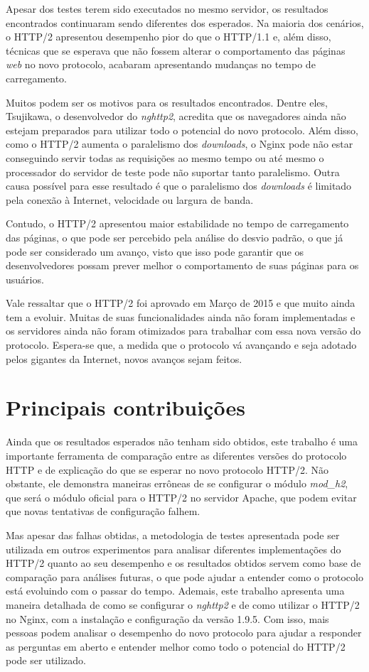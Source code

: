 Apesar dos testes terem sido executados no mesmo servidor, os resultados encontrados continuaram sendo diferentes dos esperados. Na maioria dos cenários, o HTTP/2 apresentou desempenho pior do que o HTTP/1.1 e, além disso, técnicas que se esperava que não fossem alterar o comportamento das páginas \textit{web} no novo protocolo, acabaram apresentando mudanças no tempo de carregamento.

Muitos podem ser os motivos para os resultados encontrados. Dentre eles, Tsujikawa, o desenvolvedor do \textit{nghttp2}, acredita que os navegadores ainda não estejam preparados para utilizar todo o potencial do novo protocolo. Além disso, como o HTTP/2 aumenta o paralelismo dos \textit{downloads}, o Nginx pode não estar conseguindo servir todas as requisições ao mesmo tempo ou até mesmo o processador do servidor de teste pode não suportar tanto paralelismo. Outra causa possível para esse resultado é que o paralelismo dos \textit{downloads} é limitado pela conexão à Internet, velocidade ou largura de banda.

Contudo, o HTTP/2 apresentou maior estabilidade no tempo de carregamento das páginas, o que pode ser percebido pela análise do desvio padrão, o que já pode ser considerado um avanço, visto que isso pode garantir que os desenvolvedores possam prever melhor o comportamento de suas páginas para os usuários.

Vale ressaltar que o HTTP/2 foi aprovado em Março de 2015 e que muito ainda tem a evoluir. Muitas de suas funcionalidades ainda não foram implementadas e os servidores ainda não foram otimizados para trabalhar com essa nova versão do protocolo. Espera-se que, a medida que o protocolo vá avançando e seja adotado pelos gigantes da Internet, novos avanços sejam feitos.

\section{Principais contribuições}
\label{principaiscontribuicoes}

Ainda que os resultados esperados não tenham sido obtidos, este trabalho é uma importante ferramenta de comparação entre as diferentes versões do protocolo HTTP e de explicação do que se esperar no novo protocolo HTTP/2. Não obstante, ele demonstra maneiras errôneas de se configurar o módulo \textit{mod\_h2}, que será o módulo oficial para o HTTP/2 no servidor Apache, que podem evitar que novas tentativas de configuração falhem.

Mas apesar das falhas obtidas, a metodologia de testes apresentada pode ser utilizada em outros experimentos para analisar diferentes implementações do HTTP/2 quanto ao seu desempenho e os resultados obtidos servem como base de comparação para análises futuras, o que pode ajudar a entender como o protocolo está evoluindo com o passar do tempo. Ademais, este trabalho apresenta uma maneira detalhada de como se configurar o \textit{nghttp2} e de como utilizar o HTTP/2 no Nginx, com a instalação e configuração da versão 1.9.5. Com isso, mais pessoas podem analisar o desempenho do novo protocolo para ajudar a responder as perguntas em aberto e entender melhor como todo o potencial do HTTP/2 pode ser utilizado.


